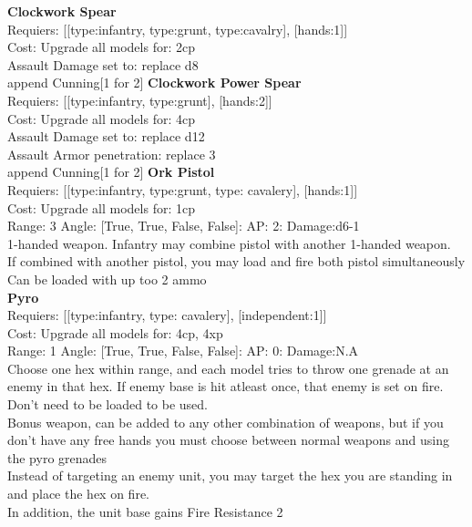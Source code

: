 {\bf Clockwork Spear } \\

Requiers: [[type:infantry, type:grunt, type:cavalry], [hands:1]] \\
Cost: Upgrade all models for: 2cp \\





Assault Damage set to: replace d8
\\ 

append Cunning[1 for 2]
{\bf Clockwork Power Spear } \\

Requiers: [[type:infantry, type:grunt], [hands:2]] \\
Cost: Upgrade all models for: 4cp \\





Assault Damage set to: replace d12
\\ 
Assault Armor penetration: replace 3 
\\ 

append Cunning[1 for 2]
{\bf Ork Pistol } \\

Requiers: [[type:infantry, type:grunt, type: cavalery], [hands:1]] \\
Cost: Upgrade all models for: 1cp \\


Range: 3  Angle: [True, True, False, False]: AP: 2: Damage:d6-1 \\
1-handed weapon. Infantry may combine pistol with another 1-handed weapon.\\ 
If combined with another pistol, you may load and fire both pistol simultaneously\\ 
Can be loaded with up too 2 ammo\\ 






{\bf Pyro } \\

Requiers: [[type:infantry, type: cavalery], [independent:1]] \\
Cost: Upgrade all models for: 4cp, 4xp \\


Range: 1  Angle: [True, True, False, False]: AP: 0: Damage:N.A \\
Choose one hex within range, and each model tries to throw one grenade at an enemy in that hex. If enemy base is hit atleast once, that enemy is set on fire.\\ 
Don't need to be loaded to be used.\\ 
Bonus weapon, can be added to any other combination of weapons, but if you don't have any free hands you must choose between normal weapons and using the pyro grenades\\ 
Instead of targeting an enemy unit, you may target the hex you are standing in and place the hex on fire.\\ 
In addition, the unit base gains Fire Resistance 2\\ 






